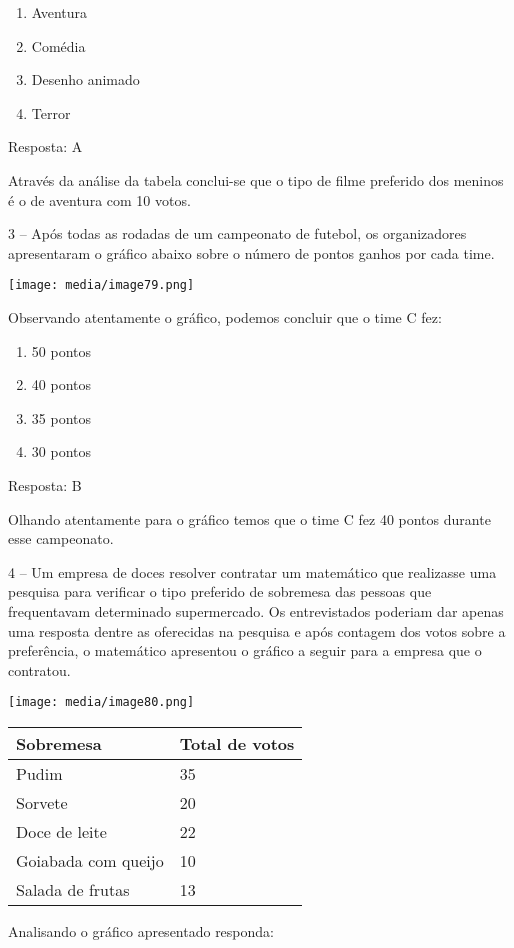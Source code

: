 \begin{enumerate}
\def\labelenumi{\alph{enumi})}
\item
  Aventura
\item
  Comédia
\item
  Desenho animado
\item
  Terror
\end{enumerate}

Resposta: A

Através da análise da tabela conclui-se que o tipo de filme preferido
dos meninos é o de aventura com 10 votos.

3 -- Após todas as rodadas de um campeonato de futebol, os organizadores
apresentaram o gráfico abaixo sobre o número de pontos ganhos por cada
time.

\texttt{[image: media/image79.png]}

Observando atentamente o gráfico, podemos concluir que o time C fez:

\begin{enumerate}
\def\labelenumi{\alph{enumi})}
\item
  50 pontos
\item
  40 pontos
\item
  35 pontos
\item
  30 pontos
\end{enumerate}

Resposta: B

Olhando atentamente para o gráfico temos que o time C fez 40 pontos
durante esse campeonato.

4 -- Um empresa de doces resolver contratar um matemático que realizasse
uma pesquisa para verificar o tipo preferido de sobremesa das pessoas
que frequentavam determinado supermercado. Os entrevistados poderiam dar
apenas uma resposta dentre as oferecidas na pesquisa e após contagem dos
votos sobre a preferência, o matemático apresentou o gráfico a seguir
para a empresa que o contratou.

\texttt{[image: media/image80.png]}

\begin{longtable}[]{@{}ll@{}}
\toprule
Sobremesa & Total de votos\tabularnewline
\midrule
\endhead
Pudim & 35\tabularnewline
Sorvete & 20\tabularnewline
Doce de leite & 22\tabularnewline
Goiabada com queijo & 10\tabularnewline
Salada de frutas & 13\tabularnewline
\bottomrule
\end{longtable}

Analisando o gráfico apresentado responda:


